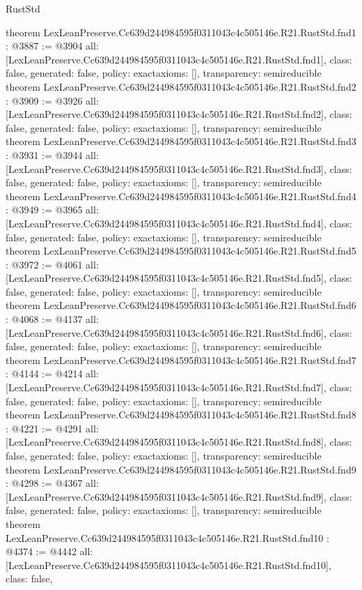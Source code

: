 \begin{lexlean}{RustStd}
\begin{coremodule}
{}
theorem LexLeanPreserve.Cc639d244984595f0311043c4c505146e.R21.RustStd.fnd1 : @3887 := @3904 {
  all: [LexLeanPreserve.Cc639d244984595f0311043c4c505146e.R21.RustStd.fnd1],
  class: false,
  generated: false,
  policy: exact{axioms: []},
  transparency: semireducible
}
theorem LexLeanPreserve.Cc639d244984595f0311043c4c505146e.R21.RustStd.fnd2 : @3909 := @3926 {
  all: [LexLeanPreserve.Cc639d244984595f0311043c4c505146e.R21.RustStd.fnd2],
  class: false,
  generated: false,
  policy: exact{axioms: []},
  transparency: semireducible
}
theorem LexLeanPreserve.Cc639d244984595f0311043c4c505146e.R21.RustStd.fnd3 : @3931 := @3944 {
  all: [LexLeanPreserve.Cc639d244984595f0311043c4c505146e.R21.RustStd.fnd3],
  class: false,
  generated: false,
  policy: exact{axioms: []},
  transparency: semireducible
}
theorem LexLeanPreserve.Cc639d244984595f0311043c4c505146e.R21.RustStd.fnd4 : @3949 := @3965 {
  all: [LexLeanPreserve.Cc639d244984595f0311043c4c505146e.R21.RustStd.fnd4],
  class: false,
  generated: false,
  policy: exact{axioms: []},
  transparency: semireducible
}
theorem LexLeanPreserve.Cc639d244984595f0311043c4c505146e.R21.RustStd.fnd5 : @3972 := @4061 {
  all: [LexLeanPreserve.Cc639d244984595f0311043c4c505146e.R21.RustStd.fnd5],
  class: false,
  generated: false,
  policy: exact{axioms: []},
  transparency: semireducible
}
theorem LexLeanPreserve.Cc639d244984595f0311043c4c505146e.R21.RustStd.fnd6 : @4068 := @4137 {
  all: [LexLeanPreserve.Cc639d244984595f0311043c4c505146e.R21.RustStd.fnd6],
  class: false,
  generated: false,
  policy: exact{axioms: []},
  transparency: semireducible
}
theorem LexLeanPreserve.Cc639d244984595f0311043c4c505146e.R21.RustStd.fnd7 : @4144 := @4214 {
  all: [LexLeanPreserve.Cc639d244984595f0311043c4c505146e.R21.RustStd.fnd7],
  class: false,
  generated: false,
  policy: exact{axioms: []},
  transparency: semireducible
}
theorem LexLeanPreserve.Cc639d244984595f0311043c4c505146e.R21.RustStd.fnd8 : @4221 := @4291 {
  all: [LexLeanPreserve.Cc639d244984595f0311043c4c505146e.R21.RustStd.fnd8],
  class: false,
  generated: false,
  policy: exact{axioms: []},
  transparency: semireducible
}
theorem LexLeanPreserve.Cc639d244984595f0311043c4c505146e.R21.RustStd.fnd9 : @4298 := @4367 {
  all: [LexLeanPreserve.Cc639d244984595f0311043c4c505146e.R21.RustStd.fnd9],
  class: false,
  generated: false,
  policy: exact{axioms: []},
  transparency: semireducible
}
theorem LexLeanPreserve.Cc639d244984595f0311043c4c505146e.R21.RustStd.fnd10 : @4374 := @4442 {
  all: [LexLeanPreserve.Cc639d244984595f0311043c4c505146e.R21.RustStd.fnd10],
  class: false,
}
\end{coremodule}
\end{lexlean}
